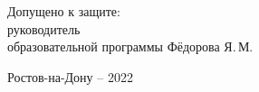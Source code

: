 \begin{singlespacing}
\begin{center}
\vspace{15mm}

\noindent
\begin{flushleft}
Допущено к защите:\\
руководитель \\
образовательной программы \underline{\hspace*{64mm}} Фёдорова Я.\,М.
\end{flushleft}




\vfill
Ростов-на-Дону -- 2022

\end{center} 

\singlespacing
\end{singlespacing}